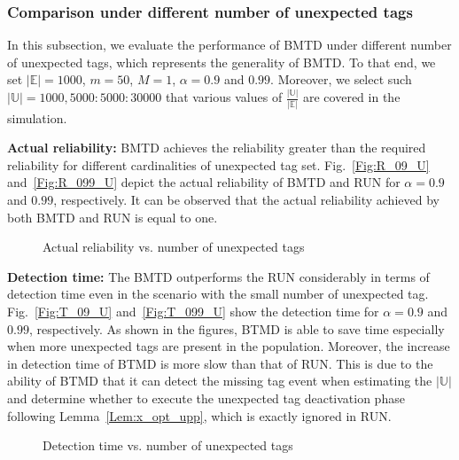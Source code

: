 \documentclass[10pt, twocolumn]{IEEEtran}
\begin{document}
\subsubsection{Comparison under different number of unexpected tags}
In this subsection, we evaluate the performance of BMTD under different number of unexpected tags, which represents the generality of BMTD. To that end, we set $|\mathbb{E}|=1000$, $m=50$, $M=1$, $\alpha=0.9$ and $0.99$. Moreover, we select such $|\mathbb{U}|=1000, 5000:5000:30000$ that various values of $\frac{|\mathbb{U}|}{|\mathbb{E}|}$ are covered in the simulation.

\textbf{Actual reliability:}
BMTD achieves the reliability greater than the required reliability for different cardinalities of unexpected tag set.
Fig.~\ref{Fig:R_09_U} and~\ref{Fig:R_099_U} depict the actual reliability of BMTD and RUN for $\alpha=0.9$ and $0.99$, respectively. It can be observed that the actual reliability achieved by both BMTD and RUN is equal to one.

\begin{figure}[htbp]
\centering
{}
\caption{Actual reliability vs. number of unexpected tags}
\label{Fig:R_U}
\end{figure}

\textbf{Detection time:}
The BMTD outperforms the RUN considerably in terms of detection time even in the scenario with the small number of unexpected tag.
Fig.~\ref{Fig:T_09_U} and~\ref{Fig:T_099_U} show the detection time for $\alpha=0.9$ and $0.99$, respectively. As shown in the figures, BTMD is able to save time especially when more unexpected tags are present in the population. Moreover, the increase in detection time of BTMD is more slow than that of RUN. This is due to the ability of BTMD that it can detect the missing tag event when estimating the $|\mathbb{U}|$ and determine whether to execute the unexpected tag deactivation phase following Lemma~\ref{Lem:x_opt_upp}, which is exactly ignored in RUN.


\begin{figure}[htbp]
\centering
{}
\caption{Detection time vs. number of unexpected tags}
\label{Fig:T_U}
\end{figure}
\end{document}
